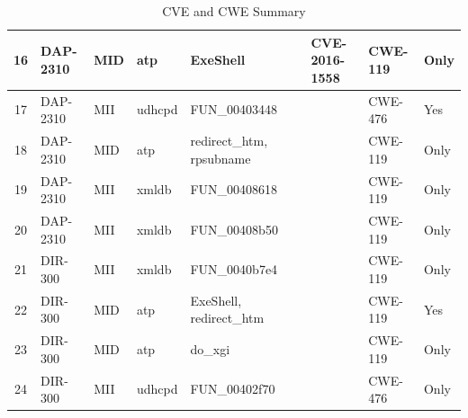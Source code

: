 \begin{table}[h]
\begin{tabular}{|c|l|l|l|l|c|l|l|l|}
\hline
16 & DAP-2310 & MID & atp & ExeShell &  & CVE-2016-1558 & CWE-119 & Only \\
\hline
17 & DAP-2310 & MII & udhcpd & FUN\_00403448 &  &  & CWE-476 & Yes \\
\hline
18 & DAP-2310 & MID & atp & redirect\_htm, rpsubname &  &  & CWE-119 & Only \\
\hline
19 & DAP-2310 & MII & xmldb & FUN\_00408618 &  &  & CWE-119 & Only \\
\hline
20 & DAP-2310 & MII & xmldb & FUN\_00408b50 &  &  & CWE-119 & Only \\
\hline
21 & DIR-300 & MII & xmldb & FUN\_0040b7e4 &  &  & CWE-119 & Only \\
\hline
22 & DIR-300 & MID & atp & ExeShell, redirect\_htm &  &  & CWE-119 & Yes \\
\hline
23 & DIR-300 & MID & atp & do\_xgi &  &  & CWE-119 & Only \\
\hline
24 & DIR-300 & MII & udhcpd & FUN\_00402f70 &  &  & CWE-476 & Only \\
\hline
\end{tabular}
\caption{CVE and CWE Summary}
\end{table}
